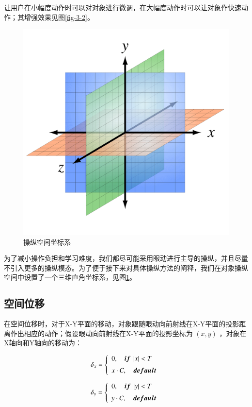让用户在小幅度动作时可以对对象进行微调，在大幅度动作时可以让对象作快速动作；其增强效果见图\ref{fig-3-2}。


\begin{figure}[t!]
    \centering
    \includegraphics[width=.4\textwidth]{figure/coordinate.png}
    \caption{操纵空间坐标系}
    \label{fig-3-3}
\end{figure}

为了减小操作负担和学习难度，我们都尽可能采用眼动进行主导的操纵，并且尽量不引入更多的操纵模态。为了便于接下来对具体操纵方法的阐释，我们在对象操纵空间中设置了一个三维直角坐标系，见图\ref{fig-3-3}。

\subsection{空间位移}

在空间位移时，对于X-Y平面的移动，对象跟随眼动向前射线在X-Y平面的投影距离作出相应的动作；假设眼动向前射线在X-Y平面的投影坐标为 $(x, y)$ ，对象在X轴向和Y轴向的移动为：

\begin{equation}
	\label{formula-3-2}
	\delta_x = 
    \left\{
    \begin{array}{l}
        0, \quad {\mbox{\boldmath $if$}}\ \left|x\right| < T \\ [0.2cm]
        x \cdot C,\quad {\mbox{\boldmath $default$}}
    \end{array}
    \right.
\end{equation}

\begin{equation}
	\label{formula-3-3}
	\delta_y = 
    \left\{
    \begin{array}{l}
        0, \quad {\mbox{\boldmath $if$}}\ \left|y\right| < T \\ [0.2cm]
        y \cdot C,\quad {\mbox{\boldmath $default$}}
    \end{array}
    \right.
\end{equation}

